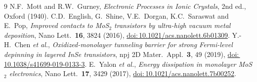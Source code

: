 \documentclass[11pt]{article}
\providecommand{\doi}[1]{\href{https://doi.org/#1}{doi:\,#1}}
\begin{document}
\begin{thebibliography}{9}
 N.F.~Mott and R.W.~Gurney, \textit{Electronic Processes in Ionic Crystals}, 2nd ed., Oxford (1940).
 C.D.~English, G.~Shine, V.E.~Dorgan, K.C.~Saraswat and E.~Pop, \textit{Improved contacts to MoS$_2$ transistors by ultra-high vacuum metal deposition}, Nano Lett.\ \textbf{16}, 3824 (2016), \doi{10.1021/acs.nanolett.6b01309}.
 Y.-H.~Chen \textit{et al.}, \textit{Oxidized-monolayer tunneling barrier for strong Fermi-level depinning in layered InSe transistors}, npj 2D Mater.\ Appl.\ \textbf{3}, 49 (2019), \doi{10.1038/s41699-019-0133-3}.
 E.~Yalon \textit{et al.}, \textit{Energy dissipation in monolayer MoS$_2$ electronics}, Nano Lett.\ \textbf{17}, 3429 (2017), \doi{10.1021/acs.nanolett.7b00252}.
\end{thebibliography}
\end{document}
